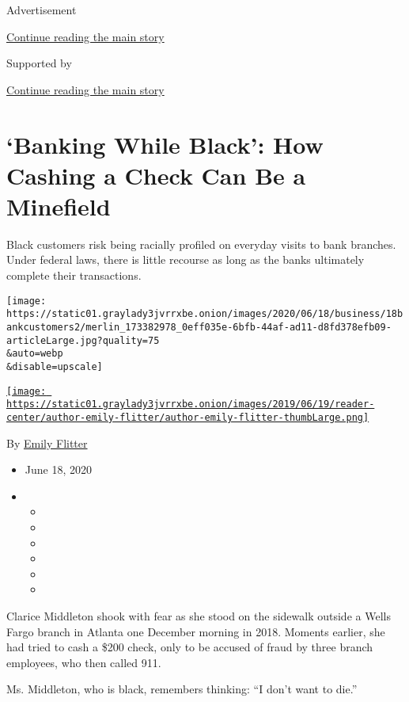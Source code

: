 Advertisement

\protect\hyperlink{after-top}{Continue reading the main story}

Supported by

\protect\hyperlink{after-sponsor}{Continue reading the main story}

\hypertarget{banking-while-black-how-cashing-a-check-can-be-a-minefield}{%
\section{`Banking While Black': How Cashing a Check Can Be a
Minefield}\label{banking-while-black-how-cashing-a-check-can-be-a-minefield}}

Black customers risk being racially profiled on everyday visits to bank
branches. Under federal laws, there is little recourse as long as the
banks ultimately complete their transactions.

\texttt{[image: https://static01.graylady3jvrrxbe.onion/images/2020/06/18/business/18bankcustomers2/merlin\_173382978\_0eff035e-6bfb-44af-ad11-d8fd378efb09-articleLarge.jpg?quality=75\\\&auto=webp\\\&disable=upscale]}

\href{https://www.nytimes3xbfgragh.onion/by/emily-flitter}{\texttt{[image: https://static01.graylady3jvrrxbe.onion/images/2019/06/19/reader-center/author-emily-flitter/author-emily-flitter-thumbLarge.png]}}

By \href{https://www.nytimes3xbfgragh.onion/by/emily-flitter}{Emily
Flitter}

\begin{itemize}
\item
  June 18, 2020
\item
  \begin{itemize}
  \item
  \item
  \item
  \item
  \item
  \item
  \end{itemize}
\end{itemize}

Clarice Middleton shook with fear as she stood on the sidewalk outside a
Wells Fargo branch in Atlanta one December morning in 2018. Moments
earlier, she had tried to cash a \$200 check, only to be accused of
fraud by three branch employees, who then called 911.

Ms. Middleton, who is black, remembers thinking: ``I don't want to
die.''

